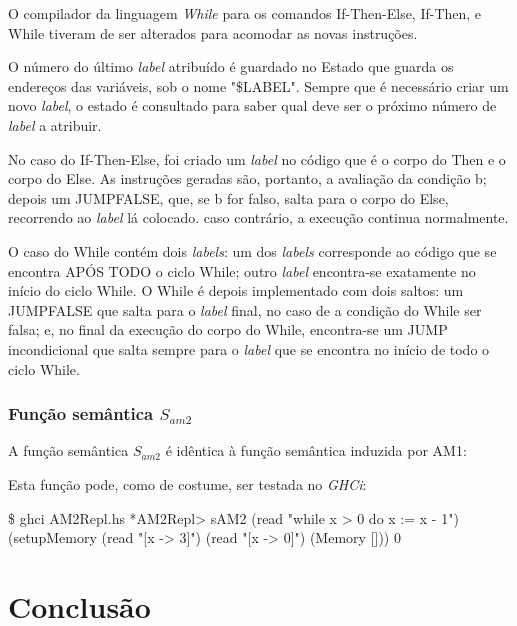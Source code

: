 \documentclass[11pt,a4paper]{report}
\newcommand{\while}[0]{\textit{While}\xspace}
\newcommand{\ghci}[0]{\textit{GHCi}\xspace}
\begin{document}
\par O compilador da linguagem \while para os comandos If-Then-Else, If-Then, e While tiveram de ser alterados para acomodar as novas instruções.

\par O número do último \textit{label} atribuído é guardado no Estado que guarda os endereços das variáveis, sob o nome "\$LABEL". Sempre que é necessário criar um novo \textit{label}, o estado é consultado para saber qual deve ser o próximo número de \textit{label} a atribuir.

\par No caso do If-Then-Else, foi criado um \textit{label} no código que é o corpo do Then e o corpo do Else. As instruções geradas são, portanto, a avaliação da condição b; depois um JUMPFALSE, que, se b for falso, salta para o corpo do Else, recorrendo ao \textit{label} lá colocado. caso contrário, a execução continua normalmente.

\newpage

\par O caso do While contém dois \textit{labels}: um dos \textit{labels} corresponde ao código que se encontra APÓS TODO o ciclo While; outro \textit{label} encontra-se exatamente no início do ciclo While. O While é depois implementado com dois saltos: um JUMPFALSE que salta para o \textit{label} final, no caso de a condição do While ser falsa; e, no final da execução do corpo do While, encontra-se um JUMP incondicional que salta sempre para o \textit{label} que se encontra no início de todo o ciclo While.

\subsection{Função semântica $S_{am2}$} \label{subsection:funcao_semantica_am2}

\par A função semântica $S_{am2}$ é idêntica à função semântica induzida por AM1:

\par Esta função pode, como de costume, ser testada no \ghci:
\begin{mintedhaskell}{\$ ghci AM2Repl.hs}
*AM2Repl> sAM2 (read "while x > 0 do x := x - 1") (setupMemory (read "[x -> 3]") (read "[x -> 0]") (Memory []))
0
\end{mintedhaskell}

\chapter{Conclusão} \label{chapter:concl}
\end{document}
